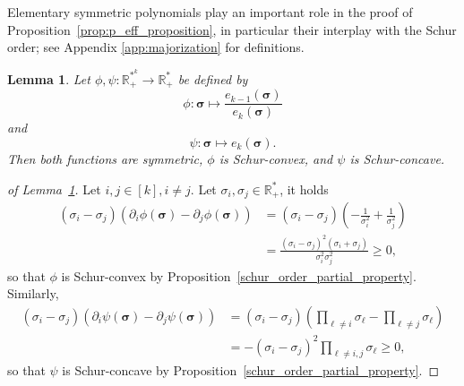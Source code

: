 \documentclass[twoside,11pt]{book}
\newtheorem{lemma}{Lemma}
\newtheorem{example}{Example}
\numberwithin{theorem}{chapter}
\numberwithin{definition}{chapter}
\numberwithin{proposition}{chapter}
\numberwithin{corollary}{chapter}
\numberwithin{example}{chapter}
\numberwithin{lemma}{chapter}
\numberwithin{assumption}{chapter}
\DeclareMathOperator{\Det}{Det}
\begin{document}
Elementary symmetric polynomials play an important role in the proof of Proposition~\ref{prop:p_eff_proposition}, in particular their interplay with the Schur order; see Appendix \ref{app:majorization} for definitions.

\begin{lemma}\label{symmetric_schur_convex_lemma}
Let $\phi, \psi:\mathbb{R}_{+}^{*^{k}} \rightarrow \mathbb{R}_{+}^{*}$ be defined by
\begin{equation}
\phi :  \bm{\sigma} \mapsto \frac{\displaystyle e_{k-1}(\bm{\sigma})}{\displaystyle e_{k}(\bm{\sigma})}
\end{equation}
and
\begin{equation}
\psi :  \bm{\sigma} \mapsto \displaystyle e_{k}(\bm{\sigma}).
\end{equation}
Then both functions are symmetric, $\phi$ is Schur-convex, and $\psi$ is Schur-concave.
\end{lemma}
\begin{proof}[of Lemma~\ref{symmetric_schur_convex_lemma}]
Let $i,j \in [k], i \neq j$. Let $\sigma_{i},\sigma_{j} \in \mathbb{R}_{+}^{*}$, it holds
\begin{align*}
    (\sigma_{i} - \sigma_{j})(\partial_{i}\phi(\bm{\sigma})-\partial_{j}\phi(\bm{\sigma})) & =  (\sigma_{i} - \sigma_{j})(-\frac{1}{\sigma_{i}^{2}} +\frac{1}{\sigma_{j}^{2}}) \\
    & = \frac{(\sigma_{i}-\sigma_{j})^{2}(\sigma_{i} +\sigma_{j})}{\sigma_{i}^{2}\sigma_{j}^{2}} \geq 0,%
\end{align*}
so that $\phi$ is Schur-convex by Proposition~\ref{schur_order_partial_property}. Similarly,
\begin{align*}
    (\sigma_{i} - \sigma_{j})(\partial_{i}\psi(\bm{\sigma})-\partial_{j}\psi(\bm{\sigma})) & =  (\sigma_{i} - \sigma_{j})(\prod_{\ell \neq i}\sigma_{\ell} - \prod_{\ell \neq j}\sigma_{\ell}) \\
    & = -(\sigma_{i}-\sigma_{j})^{2}\prod_{\ell \neq i,j}\sigma_{\ell} \geq 0, %
\end{align*}
so that $\psi$ is Schur-concave by Proposition~\ref{schur_order_partial_property}.
\end{proof}
\end{document}
